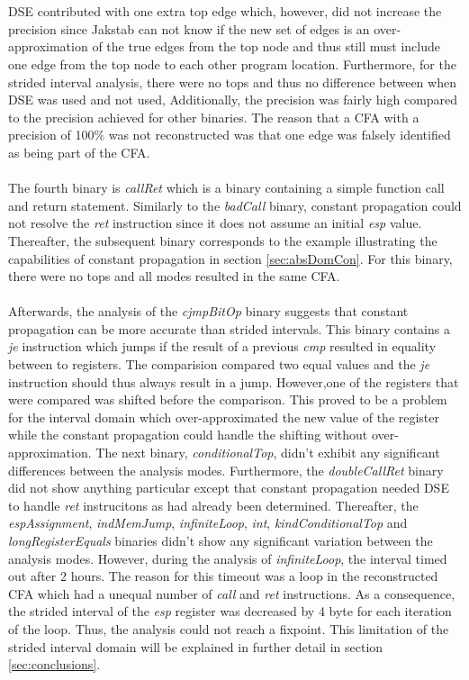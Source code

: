 \documentclass{kththesis}
\renewcommand{\it}[1]{\textit{#1}}
\begin{document}
\\ \\
DSE contributed with one extra top edge which, however, did not increase the precision since Jakstab can not know if the new set of edges is an over-approximation of the true edges from the top node and thus still must include one edge from the top node to each other program location. Furthermore, for the strided interval analysis, there were no tops and thus no difference between when DSE was used and not used, Additionally, the precision was fairly high compared to the precision achieved for other binaries. The reason that a CFA with a precision of 100\% was not reconstructed was that one edge was falsely identified as being part of the CFA.
\\ \\
The fourth binary is \it{callRet} which is a binary containing a simple function call and return statement. Similarly to the \it{badCall} binary, constant propagation could not resolve the \it{ret} instruction since it does not assume an initial \it{esp} value. Thereafter, the subsequent binary corresponds to the example illustrating the capabilities of constant propagation in section \ref{sec:absDomCon}. For this binary, there were no tops and all modes resulted in the same CFA.
\\ \\
Afterwards, the analysis of the \it{cjmpBitOp} binary suggests that constant propagation can be more accurate than strided intervals. This binary contains a \it{je} instruction which jumps if the result of a previous \it{cmp} resulted in equality between to registers. The comparision compared two equal values and the \it{je} instruction should thus always result in a jump. However,one of the registers that were compared was shifted before the comparison. This proved to be a problem for the interval domain which over-approximated the new value of the register while the constant propagation could handle the shifting without over-approximation.
\clearpage
\noindent
The next binary, \it{conditionalTop}, didn't exhibit any significant differences between the analysis modes. Furthermore, the \it{doubleCallRet} binary did not show anything particular except that constant propagation needed DSE to handle \it{ret} instrucitons as had already been determined. Thereafter, the \it{espAssignment}, \it{indMemJump}, \it{infiniteLoop}, \it{int}, \it{kindConditionalTop} and \it{longRegisterEquals} binaries didn't show any significant variation between the analysis modes. However, during the analysis of \it{infiniteLoop}, the interval timed out after 2 hours. The reason for this timeout was a loop in the reconstructed CFA which had a unequal number of \it{call} and \it{ret} instructions. As a consequence, the strided interval of the \it{esp} register was decreased by 4 byte for each iteration of the loop. Thus, the analysis could not reach a fixpoint. This limitation of the strided interval domain will be explained in further detail in section \ref{sec:conclusions}.
\end{document}
